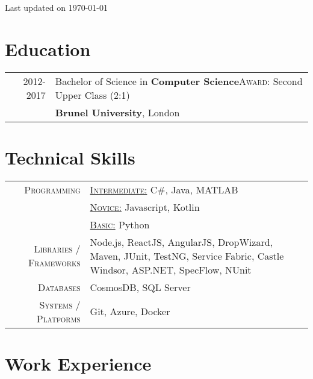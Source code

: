 \documentclass[a4paper,10pt]{extarticle} %
\begin{document}
\vspace{-0.6cm}
\hfill {\textcolor{secondary}{\scriptsize Last updated on \today}
\section{\textcolor{primary}{Education}}

\begin{tabular}{r|p{17.5cm}}	
2012-2017 & Bachelor of Science in \textbf{Computer Science}\hfill\textsc{Award}: Second Upper Class (2:1)\\
&\textbf{Brunel University}, London\\
\end{tabular}


\section{\textcolor{primary}{Technical Skills}}
\begin{tabular}{r|p{15cm}}
\textsc{Programming} & \textsc{\underline{Intermediate:}} C\#, Java, MATLAB\\
& \textsc{\underline{Novice:}} Javascript, Kotlin \\
& \textsc{\underline{Basic:}} Python \\
\textsc{Libraries / Frameworks} & Node.js, ReactJS, AngularJS, DropWizard, Maven, JUnit, TestNG, Service Fabric, Castle Windsor, ASP.NET, SpecFlow, NUnit\\
\textsc{Databases} & CosmosDB, SQL Server\\
\textsc{Systems / Platforms} & Git, Azure, Docker\\
\end{tabular}

\section{\textcolor{primary}{Work Experience}}


}
\end{document}
